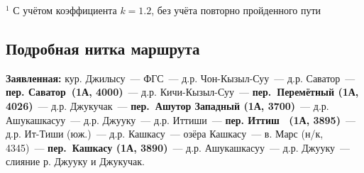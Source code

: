 \begin{table}[h!]
\end{table}
\footnotesize{$^1$ С учётом коэффициента $k=1.2$, без учёта повторно пройденного пути}
\normalsize

\subsection{Подробная нитка маршрута}
\textbf{Заявленная:} кур. Джилысу~--- ФГС~--- д.р. Чон-Кызыл-Суу~--- д.р. Саватор~---  \textbf{пер. Саватор~(1А, 4000)}~--- д.р. Кичи-Кызыл-Суу~---  \textbf{пер.~Перемётный (1А, 4026)}~--- д.р. Джукучак~--- \textbf{пер.~Ашутор Западный (1А, 3700)}~--- д.р. Ашукашкасуу~---  д.р. Джууку~---  д.р. Иттиши~---  \textbf{пер. Иттиш ~(1А, 3895)}~---  д.р. Ит-Тиши (юж.)~---   д.р. Кашкасу~---   озёра Кашкасу~---  в. Марс (н/к, 4345)~---  \textbf{пер.~Кашкасу  (1А, 3890)}~--- д.р. Ашукашкасуу~--- д.р. Джууку~--- слияние р. Джууку и Джукучак.

